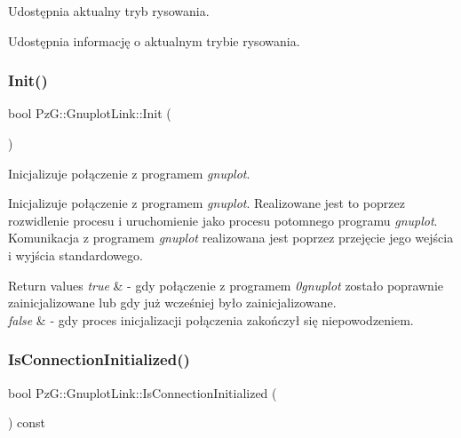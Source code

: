 Udostępnia aktualny tryb rysowania. 

Udostępnia informację o aktualnym trybie rysowania. \mbox{\label{class_pz_g_1_1_gnuplot_link_a7f9c65c2319f35f1b7663ba0ad461d14}} 
\subsubsection{\texorpdfstring{Init()}{Init()}}
{\footnotesize\ttfamily bool Pz\+G\+::\+Gnuplot\+Link\+::\+Init (\begin{DoxyParamCaption}{ }\end{DoxyParamCaption})}



Inicjalizuje połączenie z programem {\itshape gnuplot}. 

Inicjalizuje połączenie z programem {\itshape gnuplot}. Realizowane jest to poprzez rozwidlenie procesu i uruchomienie jako procesu potomnego programu {\itshape gnuplot}. Komunikacja z programem {\itshape gnuplot} realizowana jest poprzez przejęcie jego wejścia i wyjścia standardowego.


\begin{DoxyRetVals}{Return values}
{\em true} & -\/ gdy połączenie z programem {\itshape 0gnuplot} zostało poprawnie zainicjalizowane lub gdy już wcześniej było zainicjalizowane. \\
\hline
{\em false} & -\/ gdy proces inicjalizacji połączenia zakończył się niepowodzeniem. \\
\hline
\end{DoxyRetVals}
\mbox{\label{class_pz_g_1_1_gnuplot_link_a23e53f7a9d3ca945545f9292c55a7c96}} 
\subsubsection{\texorpdfstring{Is\+Connection\+Initialized()}{IsConnectionInitialized()}}
{\footnotesize\ttfamily bool Pz\+G\+::\+Gnuplot\+Link\+::\+Is\+Connection\+Initialized (\begin{DoxyParamCaption}{ }\end{DoxyParamCaption}) const}



